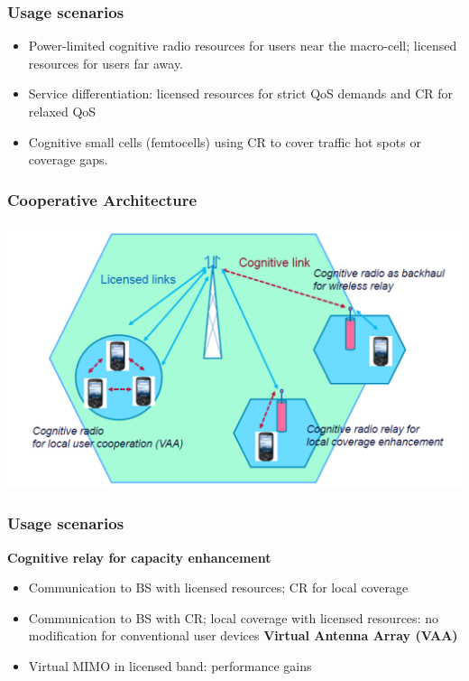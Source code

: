 \documentclass{beamer}
\begin{document}
\begin{frame}
\frametitle{Usage scenarios}
\begin{itemize}
\item Power-limited cognitive radio resources for users near the macro-cell; licensed resources for users far away.
\item Service differentiation: licensed resources for strict QoS demands and CR for relaxed QoS
\item Cognitive small cells (femtocells) using CR to cover traffic hot spots or coverage gaps.
\end{itemize}
\end{frame}

\begin{frame}
\frametitle{Cooperative Architecture}
\includegraphics[scale=0.5]{arch}
\end{frame}


\begin{frame}
\frametitle{Usage scenarios}
\textbf{Cognitive relay for capacity enhancement}
\begin{itemize}
\item Communication to BS with licensed resources; CR for local coverage
\item Communication to BS with CR; local coverage with licensed resources: no modification for conventional user devices
\textbf{Virtual Antenna Array (VAA)}
\item Virtual MIMO in licensed band: performance gains
\end{itemize}
\end{frame}
\end{document}
